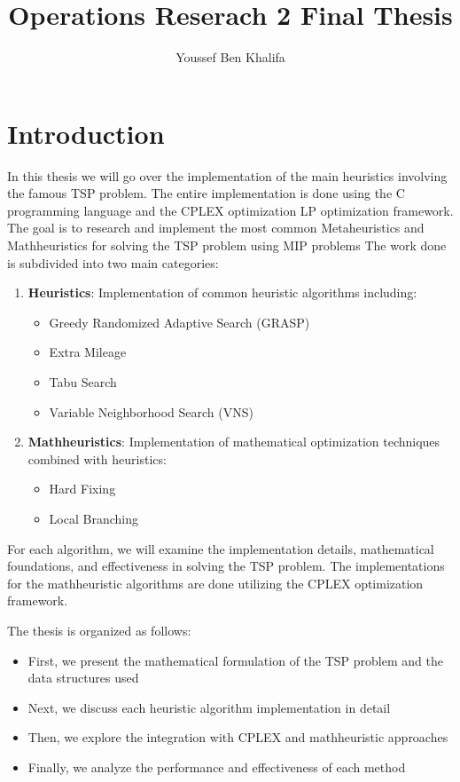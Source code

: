 \documentclass{article}
\title{Operations Reserach 2 Final Thesis}
\author{Youssef Ben Khalifa}
\begin{document}
\maketitle

\section{Introduction}
In this thesis we will go over the implementation of the main heuristics involving the famous TSP problem. The entire implementation is done using the C programming language and the CPLEX optimization LP optimization framework.
The goal is to research and implement the most common Metaheuristics and Mathheuristics for solving the TSP problem using MIP problems 
The work done is subdivided into two main categories:
\begin{enumerate}
	\item \textbf{Heuristics}: Implementation of common heuristic algorithms including:
		\begin{itemize}
			\item Greedy Randomized Adaptive Search (GRASP)
			\item Extra Mileage
			\item Tabu Search
			\item Variable Neighborhood Search (VNS)
		\end{itemize}
	\item \textbf{Mathheuristics}: Implementation of mathematical optimization techniques combined with heuristics:
		\begin{itemize}
			\item Hard Fixing
			\item Local Branching
		\end{itemize}
\end{enumerate}

For each algorithm, we will examine the implementation details, mathematical foundations, and effectiveness in solving the TSP problem. 
The implementations for the mathheuristic algorithms are done utilizing the CPLEX optimization framework. 

The thesis is organized as follows:
\begin{itemize}
	\item First, we present the mathematical formulation of the TSP problem and the data structures used
	\item Next, we discuss each heuristic algorithm implementation in detail
	\item Then, we explore the integration with CPLEX and mathheuristic approaches
	\item Finally, we analyze the performance and effectiveness of each method
\end{itemize}
 
\end{document}
